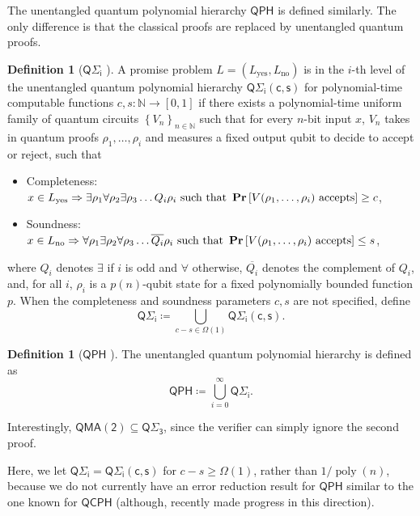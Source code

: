 \documentclass[10pt,a4paper]{article}
\theoremstyle{definition}
\newtheorem{definition}[theorem]{Definition}
\renewcommand{\Pr}{\mathop{\bf Pr\/}}
\DeclareMathOperator{\poly}{poly}
\newcommand{\yes}{\text{yes}}
\newcommand{\no}{\text{no}}
\newcommand{\nats}{\mathbb N}
\newcommand{\N}{\nats}
\newcommand{\class}[1]{\ensuremath{\mathsf{#1}}\xspace}
\newcommand{\QMAk}[1][k]{\class{QMA(#1)}}
\newcommand{\QMAtwo}{\QMAk[2]}
\newcommand{\QCPH}{\class{QCPH}}
\newcommand{\QPH}{\class{QPH}}
\newcommand{\QSigmai}[1][i]{\class{Q\Sigma_{#1}}}
\begin{document}
The unentangled quantum polynomial hierarchy $\QPH$ is defined similarly. The only difference is that the classical proofs are replaced by unentangled quantum proofs. 

\begin{definition}[$\QSigmai$ {\cite{GSSSY22_qph}}] \label{def:prodqsigmai}
    A promise problem $L=(L_\yes, L_\no)$ is in the $i$-th level of the unentangled quantum polynomial hierarchy $\QSigmai[i]\class{(c,s)}$ for polynomial-time computable functions $c, s: \N \to [0,1]$ if there exists a polynomial-time uniform family of quantum circuits $\left\{V_n \right\}_{n \in \N}$ such that for every $n$-bit input $x$, $V_n$ takes in quantum proofs $\rho_1, \dots, \rho_i$ and measures a fixed output qubit to decide to accept or reject, such that
    \begin{itemize}
        \item Completeness: $ x \in L_\yes \Rightarrow  \exists \rho_1 \forall \rho_2 \exists \rho_3 \dots Q_i \rho_i \text{ such that } \Pr\left[ V(\rho_1, \dots, \rho_i) \text{ accepts}\right] \geq c $,
        \item Soundness: $ x\in L_\no \Rightarrow  \forall \rho_1 \exists \rho_2  \forall \rho_3 \dots \overline{Q_i} \rho_i  \text{ such that } \Pr\left[ V(\rho_{1},\dots, \rho_i) \text{ accepts}\right] \leq s $,
    \end{itemize}
   where $Q_i$ denotes $\exists$ if $i$ is odd and $\forall$ otherwise, $\overline{Q_i}$ denotes the complement of $Q_i$, and, for all $i$, $\rho_i$ is a $p(n)$-qubit state for a fixed polynomially bounded function $p$. 
   When the completeness and soundness parameters $c, s$ are not specified, define
    \[
        \QSigmai[i] \coloneqq \bigcup_{c-s \in \Omega(1)} \QSigmai[i]\class{(c,s)}.
    \]
\end{definition}
\begin{definition}[$\QPH$ {\cite{GSSSY22_qph}}]
The unentangled quantum polynomial hierarchy is defined as 
\[
\QPH \coloneqq \bigcup_{i=0}^\infty \QSigmai.
\]
\end{definition}

\noindent Interestingly, $\QMAtwo \subseteq \QSigmai[3]$, since the verifier can simply ignore the second proof. 

Here, we let $\QSigmai[i] = \QSigmai[i]\class{(c,s)}$ for $c-s \geq \Omega(1)$, rather than $1/\poly(n)$, because we do not currently have an error reduction result for $\QPH$ similar to the one known for $\QCPH$ (although, \cite{agarwal2023quantum} recently made progress in this direction). 
\end{document}
